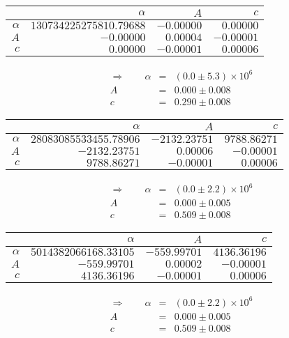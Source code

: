  \begin{tabular}{|r|r|r|r|}
 \hline 
\cellcolor{tabcolor}&\cellcolor{tabcolor}$\alpha$&\cellcolor{tabcolor}$A$&\cellcolor{tabcolor}$c$\\ \hline 
 \cellcolor{tabcolor}$\alpha$&$130734225275810.79688$ &$-0.00000$ &$0.00000$ \\ \hline
\cellcolor{tabcolor}$A$&$-0.00000$ &$0.00004$ &$-0.00001$ \\ \hline
\cellcolor{tabcolor}$c$&$0.00000$ &$-0.00001$ &$0.00006$ \\ \hline
\end{tabular}
\begin{align}\Rightarrow \qquad
    \alpha &=& \left(0.0 \pm 5.3\right) \times 10^{6} \\
    A &=& 0.000 \pm 0.008 \\
    c &=& 0.290 \pm 0.008 
\end{align}

 \begin{tabular}{|r|r|r|r|}
 \hline 
\cellcolor{tabcolor}&\cellcolor{tabcolor}$\alpha$&\cellcolor{tabcolor}$A$&\cellcolor{tabcolor}$c$\\ \hline 
 \cellcolor{tabcolor}$\alpha$&$28083085533455.78906$ &$-2132.23751$ &$9788.86271$ \\ \hline
\cellcolor{tabcolor}$A$&$-2132.23751$ &$0.00006$ &$-0.00001$ \\ \hline
\cellcolor{tabcolor}$c$&$9788.86271$ &$-0.00001$ &$0.00006$ \\ \hline
\end{tabular}
\begin{align}\Rightarrow \qquad
    \alpha &=& \left(0.0 \pm 2.2\right) \times 10^{6} \\
    A &=& 0.000 \pm 0.005 \\
    c &=& 0.509 \pm 0.008 
\end{align}

 \begin{tabular}{|r|r|r|r|}
 \hline 
\cellcolor{tabcolor}&\cellcolor{tabcolor}$\alpha$&\cellcolor{tabcolor}$A$&\cellcolor{tabcolor}$c$\\ \hline 
 \cellcolor{tabcolor}$\alpha$&$5014382066168.33105$ &$-559.99701$ &$4136.36196$ \\ \hline
\cellcolor{tabcolor}$A$&$-559.99701$ &$0.00002$ &$-0.00001$ \\ \hline
\cellcolor{tabcolor}$c$&$4136.36196$ &$-0.00001$ &$0.00006$ \\ \hline
\end{tabular}
\begin{align}\Rightarrow \qquad
    \alpha &=& \left(0.0 \pm 2.2\right) \times 10^{6} \\
    A &=& 0.000 \pm 0.005 \\
    c &=& 0.509 \pm 0.008 
\end{align}

